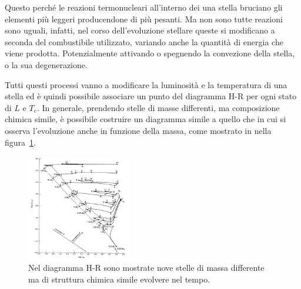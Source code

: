 Questo perché le reazioni termonucleari all'interno dei una stella bruciano gli elementi più leggeri producendone di più pesanti. Ma non sono tutte reazioni sono uguali, infatti, nel corso dell'evoluzione stellare queste si modificano a seconda del combustibile utilizzato, variando anche la quantità di energia che viene prodotta. Potenzialmente attivando o spegnendo la convezione della stella, o la sua degenerazione.

Tutti questi processi vanno a modificare la luminosità e la temperatura di una stella ed è quindi possibile associare un punto del diagramma H-R per ogni stato di $L$ e $T_e$. In generale, prendendo stelle di masse differenti, ma composizione chimica simile, è possibile costruire un diagramma simile a quello che in cui si osserva l'evoluzione anche in funzione della massa, come mostrato in nella figura~\ref{fig:evo}.
\begin{figure}
    \centering
    \includegraphics[width=0.4\textwidth]{immagini/evo.png}
    \caption{Nel diagramma H-R sono mostrate nove stelle di massa differente ma di struttura chimica simile evolvere nel tempo.}\label{fig:evo}
\end{figure}
